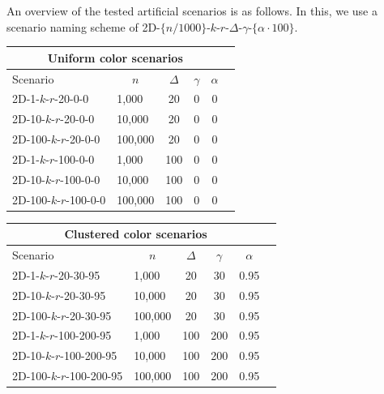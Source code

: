 \documentclass{article}
\newcommand{\fb}[1]{{\color{blue}#1}}
\begin{document}
An overview of the tested artificial scenarios is as follows. \fb{In this, we use a scenario naming scheme of 2D-$\{n/1000\}$-$k$-$r$-$\Delta$-$\gamma$-$\{\alpha \cdot 100\}$.}  \\
\begin{center}
    
    \begin{tabular}{|l||l|c|c|c|c|}
        \hline
        \multicolumn{5}{|c|}{Uniform color scenarios}                     \\
        \hline
        Scenario               & \multicolumn{1}{|c|}{$n$}     & $\Delta$ & $\gamma$ & $\alpha$ \\
        \hline
        2D-1-$k$-$r$-20-0-0    & 1,000   & 20       & 0        & 0        \\
        2D-10-$k$-$r$-20-0-0   & 10,000  & 20       & 0        & 0        \\
        2D-100-$k$-$r$-20-0-0  & 100,000 & 20       & 0        & 0        \\
        2D-1-$k$-$r$-100-0-0   & 1,000   & 100      & 0        & 0        \\
        2D-10-$k$-$r$-100-0-0  & 10,000  & 100      & 0        & 0        \\
        2D-100-$k$-$r$-100-0-0 & 100,000 & 100      & 0        & 0        \\
        \hline
    \end{tabular}
    \:\:
    \begin{tabular}{|l||l|c|c|c|c|}
        \hline
        \multicolumn{5}{|c|}{Clustered color scenarios}                      \\
    \hline
    Scenario                  & \multicolumn{1}{|c|}{$n$}    & $\Delta$ & $\gamma$ & $\alpha$ \\
    \hline
    2D-1-$k$-$r$-20-30-95     & 1,000   & 20       & 30       & 0.95     \\
    2D-10-$k$-$r$-20-30-95    & 10,000  & 20       & 30       & 0.95     \\
    2D-100-$k$-$r$-20-30-95   & 100,000 & 20       & 30       & 0.95     \\
    2D-1-$k$-$r$-100-200-95   & 1,000   & 100      & 200      & 0.95     \\
    2D-10-$k$-$r$-100-200-95  & 10,000  & 100      & 200      & 0.95     \\
    2D-100-$k$-$r$-100-200-95 & 100,000 & 100      & 200      & 0.95     \\
    \hline
\end{tabular}
\end{center}
\end{document}

